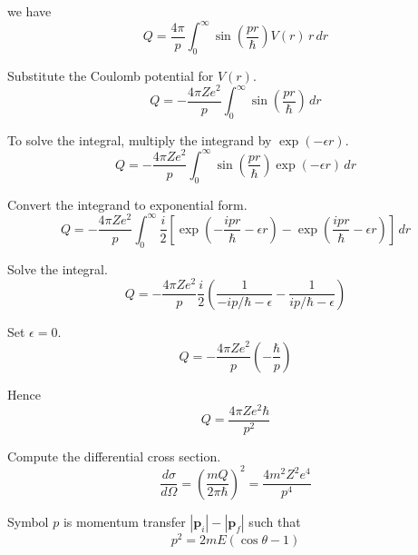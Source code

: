 we have
\begin{equation*}
Q=\frac{4\pi}{p}
\int_0^\infty\sin\left(\frac{pr}{\hbar}\right)V(r)\,r\,dr
\end{equation*}

Substitute the Coulomb potential for $V(r)$.
\begin{equation*}
Q=-\frac{4\pi Ze^2}{p}
\int_0^\infty\sin\left(\frac{pr}{\hbar}\right)\,dr
\end{equation*}

To solve the integral, multiply the integrand by $\exp(-\epsilon r)$.
\begin{equation*}
Q=-\frac{4\pi Ze^2}{p}
\int_0^\infty\sin\left(\frac{pr}{\hbar}\right)\exp(-\epsilon r)\,dr
\end{equation*}

Convert the integrand to exponential form.
\begin{equation*}
Q=-\frac{4\pi Ze^2}{p}
\int_0^\infty\frac{i}{2}\left[
\exp\left(-\frac{ipr}{\hbar}-\epsilon r\right)
-\exp\left(\frac{ipr}{\hbar}-\epsilon r\right)
\right]\,dr
\end{equation*}

Solve the integral.
\begin{equation*}
Q=-\frac{4\pi Ze^2}{p}\frac{i}{2}
\left(\frac{1}{-ip/\hbar-\epsilon}-\frac{1}{ip/\hbar-\epsilon}\right)
\tag{1}
\end{equation*}

Set $\epsilon=0$.
\begin{equation*}
Q=-\frac{4\pi Ze^2}{p}\left(-\frac{\hbar}{p}\right)
\end{equation*}

Hence
\begin{equation*}
Q=\frac{4\pi Ze^2\hbar}{p^2}
\end{equation*}

Compute the differential cross section.
\begin{equation*}
\frac{d\sigma}{d\Omega}=\left(\frac{mQ}{2\pi\hbar}\right)^2
=\frac{4m^2Z^2e^4}{p^4}
\end{equation*}

Symbol $p$ is momentum transfer $|\mathbf p_i|-|\mathbf p_f|$ such that
\begin{equation*}
p^2=2mE(\cos\theta-1)
\end{equation*}


